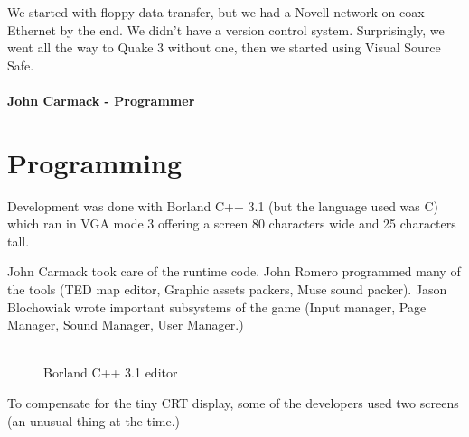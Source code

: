 \documentclass[book.tex]{subfiles}
\begin{document}
 \begin{fancyquotes}
We started with floppy data transfer, but we had a Novell network on coax Ethernet by the end. We didn't have a version control system.  Surprisingly, we went all the way to Quake 3 without one, then we started using Visual Source Safe.\\
 \\
\textbf{John Carmack - Programmer}
\end{fancyquotes}


























\section{Programming}



Development was done with Borland C++ 3.1 (but the language used was C) which ran in VGA mode 3 offering a screen 80 characters wide and 25 characters tall.\\
\par
John Carmack took care of the runtime code. John Romero programmed many of the tools (TED map editor, Graphic assets packers, Muse sound packer). Jason Blochowiak wrote important subsystems of the game (Input manager, Page Manager, Sound Manager, User Manager.)\\
\\
\begin{figure}[H]
\centering
\caption{Borland C++ 3.1 editor}
\end{figure}


To compensate for the tiny CRT display, some of the developers used two screens (an unusual thing at the time.)\\
\end{document}
